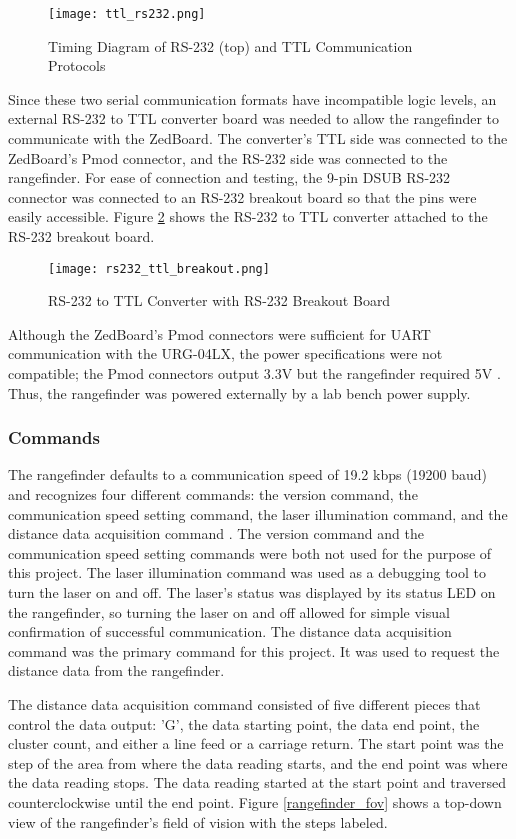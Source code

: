 \begin{figure}[H]
	\centerline{\texttt{[image: ttl\_rs232.png]}}
	\caption{Timing Diagram of RS-232 (top) and TTL Communication Protocols \cite{ttl}}
	\label{ttl_rs232_pic}
\end{figure}

Since these two serial communication formats have incompatible logic levels, an external RS-232 to TTL converter board was needed to allow the rangefinder to communicate with the ZedBoard. The converter's TTL side was connected to the ZedBoard's Pmod connector, and the RS-232 side was connected to the rangefinder. For ease of connection and testing, the 9-pin DSUB RS-232 connector was connected to an RS-232 breakout board so that the pins were easily accessible. Figure \ref{rs232_ttl_breakout} shows the RS-232 to TTL converter attached to the RS-232 breakout board.

\begin{figure}[H]
	\centerline{\texttt{[image: rs232\_ttl\_breakout.png]}}
	\caption{RS-232 to TTL Converter with RS-232 Breakout Board}
	\label{rs232_ttl_breakout}
\end{figure}

Although the ZedBoard's Pmod connectors were sufficient for UART communication with the URG-04LX, the power specifications were not compatible; the Pmod connectors output 3.3V but the rangefinder required 5V \cite{zedboard_datasheet, urg04lx_specifications}. Thus, the rangefinder was powered externally by a lab bench power supply.

\subsubsection{Commands}
The rangefinder defaults to a communication speed of 19.2 kbps (19200 baud) and recognizes four different commands: the version command, the communication speed setting command, the laser illumination command, and the distance data acquisition command \cite{urg04lx_datasheet}. The version command and the communication speed setting commands were both not used for the purpose of this project. The laser illumination command was used as a debugging tool to turn the laser on and off. The laser's status was displayed by its status LED on the rangefinder, so turning the laser on and off allowed for simple visual confirmation of successful communication. The distance data acquisition command was the primary command for this project. It was used to request the distance data from the rangefinder.
\par
The distance data acquisition command consisted of five different pieces that control the data output: 'G', the data starting point, the data end point, the cluster count, and either a line feed or a carriage return. The start point was the step of the area from where the data reading starts, and the end point was where the data reading stops. The data reading started at the start point and traversed counterclockwise until the end point. Figure \ref{rangefinder_fov} shows a top-down view of the rangefinder's field of vision with the steps labeled.


